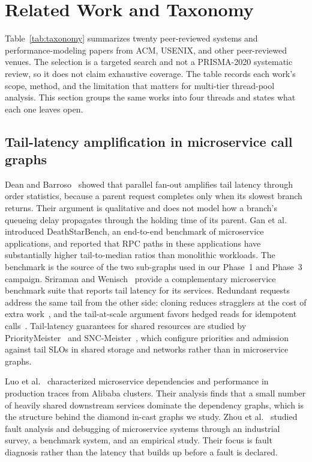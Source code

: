 \section{Related Work and Taxonomy}
\label{sec:related}

Table~\ref{tab:taxonomy} summarizes twenty peer-reviewed systems and performance-modeling papers from ACM, USENIX, and other peer-reviewed venues. The selection is a targeted search and not a PRISMA-2020 systematic review, so it does not claim exhaustive coverage. The table records each work's scope, method, and the limitation that matters for multi-tier thread-pool analysis. This section groups the same works into four threads and states what each one leaves open.

\subsection{Tail-latency amplification in microservice call graphs}

Dean and Barroso~\cite{dean2013tailatscale} showed that parallel fan-out amplifies tail latency through order statistics, because a parent request completes only when its slowest branch returns. Their argument is qualitative and does not model how a branch's queueing delay propagates through the holding time of its parent. Gan et al.~\cite{gan2019deathstarbench} introduced DeathStarBench, an end-to-end benchmark of microservice applications, and reported that RPC paths in these applications have substantially higher tail-to-median ratios than monolithic workloads. The benchmark is the source of the two sub-graphs used in our Phase~1 and Phase~3 campaign. Sriraman and Wenisch~\cite{sriraman2018musuite} provide a complementary microservice benchmark suite that reports tail latency for its services. Redundant requests address the same tail from the other side: cloning reduces stragglers at the cost of extra work~\cite{ananthanarayanan2013clones}, and the tail-at-scale argument favors hedged reads for idempotent calls~\cite{dean2013tailatscale}. Tail-latency guarantees for shared resources are studied by PriorityMeister~\cite{zhu2014prioritymeister} and SNC-Meister~\cite{zhu2016snc}, which configure priorities and admission against tail SLOs in shared storage and networks rather than in microservice graphs.

Luo et al.~\cite{luo2021characterizing} characterized microservice dependencies and performance in production traces from Alibaba clusters. Their analysis finds that a small number of heavily shared downstream services dominate the dependency graphs, which is the structure behind the diamond in-cast graphs we study. Zhou et al.~\cite{zhou2021fault} studied fault analysis and debugging of microservice systems through an industrial survey, a benchmark system, and an empirical study. Their focus is fault diagnosis rather than the latency that builds up before a fault is declared.

